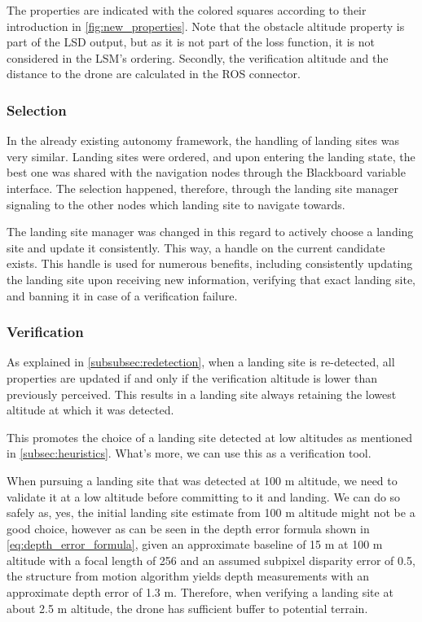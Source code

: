 The properties are indicated with the colored squares according to their introduction in \cref{fig:new_properties}. Note that the obstacle altitude property is part of the LSD output, but as it is not part of the loss function, it is not considered in the LSM's ordering. Secondly, the verification altitude and the distance to the drone are calculated in the ROS connector.

\subsubsection{Selection}

In the already existing autonomy framework, the handling of landing sites was very similar. Landing sites were ordered, and upon entering the landing state, the best one was shared with the navigation nodes through the Blackboard variable interface. The selection happened, therefore, through the landing site manager signaling to the other nodes which landing site to navigate towards.

The landing site manager was changed in this regard to actively choose a landing site and update it consistently. This way, a handle on the current candidate exists. This handle is used for numerous benefits, including consistently updating the landing site upon receiving new information, verifying that exact landing site, and banning it in case of a verification failure. 

\subsubsection{Verification}\label{subsubsec:verification}

As explained in \cref{subsubsec:redetection}, when a landing site is re-detected, all properties are updated if and only if the verification altitude is lower than previously perceived. This results in a landing site always retaining the lowest altitude at which it was detected.

This promotes the choice of a landing site detected at low altitudes as mentioned in \cref{subsec:heuristics}. What's more, we can use this as a verification tool.

When pursuing a landing site that was detected at 100 m altitude, we need to validate it at a low altitude before committing to it and landing. We can do so safely as, yes, the initial landing site estimate from 100 m altitude might not be a good choice, however as can be seen in the depth error formula shown in \cref{eq:depth_error_formula}, given an approximate baseline of 15 m at 100 m altitude with a focal length of 256 and an assumed subpixel disparity error of 0.5, the structure from motion algorithm yields depth measurements with an approximate depth error of 1.3 m. Therefore, when verifying a landing site at about 2.5 m altitude, the drone has sufficient buffer to potential terrain.

